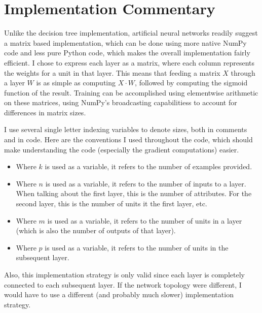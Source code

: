 \documentclass[fleqn]{homework}
\begin{document}
  \maketitle

  \section{Implementation Commentary}

  Unlike the decision tree implementation, artificial neural networks readily
  suggest a matrix based implementation, which can be done using more native
  NumPy code and less pure Python code, which makes the overall implementation
  fairly efficient.  I chose to express each layer as a matrix, where each
  column represents the weights for a unit in that layer.  This means that
  feeding a matrix $X$ through a layer $W$ is as simple as computing
  $X \cdot W$, followed by computing the sigmoid function of the result.
  Training can be accomplished using elementwise arithmetic on these matrices,
  using NumPy's broadcasting capabilitiess to account for differences in matrix
  sizes.

  I use several single letter indexing variables to denote sizes, both in
  comments and in code.  Here are the conventions I used throughout the code,
  which should make understanding the code (especially the gradient
  computations) easier.

  \begin{itemize}
  \item Where $k$ is used as a variable, it refers to the number of examples
    provided.
  \item Where $n$ is used as a variable, it refers to the number of inputs to a
    layer.  When talking about the first layer, this is the number of
    attributes.  For the second layer, this is the number of units it the first
    layer, etc.
  \item Where $m$ is used as a variable, it refers to the number of units in a
    layer (which is also the number of outputs of that layer).
  \item Where $p$ is used as a variable, it refers to the number of units in the
    subsequent layer.
  \end{itemize}

  Also, this implementation strategy is only valid since each layer is
  completely connected to each subsequent layer.  If the network topology were
  different, I would have to use a different (and probably much slower)
  implementation strategy.
\end{document}
